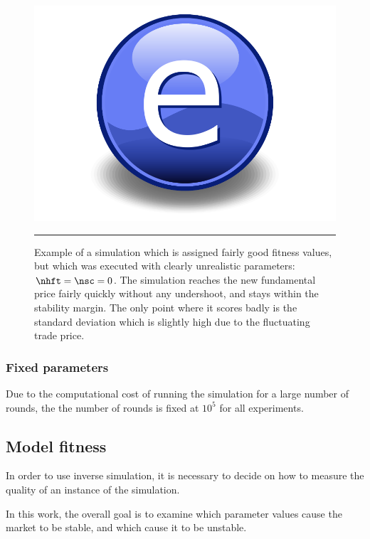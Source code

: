 \begin{figure}[htbp]
	\centering
		\includegraphics{Figures/Electron.pdf}
		\rule{35em}{0.5pt}
	\caption{Example of a simulation which is assigned fairly good fitness values, but which was executed with clearly unrealistic parameters: $\nhft = \nsc = 0$. The simulation reaches the new fundamental price fairly quickly without any undershoot, and stays within the stability margin. The only point where it scores badly is the standard deviation which is slightly high due to the fluctuating trade price.}
	\label{fig:no_marketmakers}
\end{figure}

		


\subsubsection{Fixed parameters}
Due to the computational cost of running the simulation for a large number of rounds, the the number of rounds is fixed at $10^5$ for all experiments.




\subsection{Model fitness}\label{section:simulation_fitness}

In order to use inverse simulation, it is necessary to decide on how to measure the quality of an instance of the simulation. 



In this work, the overall goal is to examine which parameter values cause the market to be stable, and which cause it to be unstable. 



